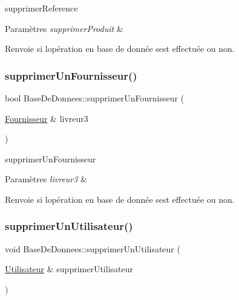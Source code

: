 supprimer\+Reference 


\begin{DoxyParams}{Paramètres}
{\em supprimer\+Produit} & \\
\hline
\end{DoxyParams}
\begin{DoxyReturn}{Renvoie}
si l\textquotesingle{}opération en base de donnée s\textquotesingle{}est effectuée ou non. 
\end{DoxyReturn}
\mbox{\label{class_base_de_donnees_a90ac8e5f412153ce4ab5a4c7a603f5e9}} 
\subsubsection{\texorpdfstring{supprimer\+Un\+Fournisseur()}{supprimerUnFournisseur()}}
{\footnotesize\ttfamily bool Base\+De\+Donnees\+::supprimer\+Un\+Fournisseur (\begin{DoxyParamCaption}\item[{\mbox{\hyperlink{class_fournisseur}{Fournisseur}} \&}]{livreur3 }\end{DoxyParamCaption})}



supprimer\+Un\+Fournisseur 


\begin{DoxyParams}{Paramètres}
{\em livreur3} & \\
\hline
\end{DoxyParams}
\begin{DoxyReturn}{Renvoie}
si l\textquotesingle{}opération en base de donnée s\textquotesingle{}est effectuée ou non. 
\end{DoxyReturn}
\mbox{\label{class_base_de_donnees_a7ead23bc4e5d3bc897d9c6a412bbc0a6}} 
\subsubsection{\texorpdfstring{supprimer\+Un\+Utilisateur()}{supprimerUnUtilisateur()}}
{\footnotesize\ttfamily void Base\+De\+Donnees\+::supprimer\+Un\+Utilisateur (\begin{DoxyParamCaption}\item[{\mbox{\hyperlink{class_utilisateur}{Utilisateur}} \&}]{supprimer\+Utilisateur }\end{DoxyParamCaption})}



